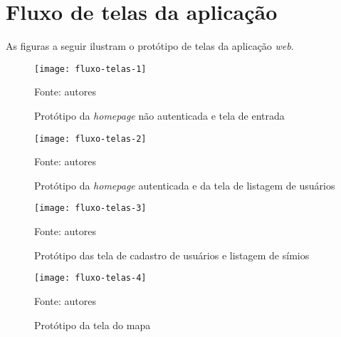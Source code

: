 \chapter{Fluxo de telas da aplicação}

As figuras a seguir ilustram o protótipo de telas da aplicação \emph{web}.

\begin{figure}[ht]
  \centering
    \caption{Protótipo da \emph{homepage} não autenticada e tela de entrada}
    \texttt{[image: fluxo-telas-1]}
  \centerline{\small{Fonte: autores}}
\end{figure}

\begin{figure}[ht]
  \centering
    \caption{Protótipo da \emph{homepage} autenticada e da tela de listagem de usuários} 
    \texttt{[image: fluxo-telas-2]}
  \centerline{\small{Fonte: autores}}
\end{figure}

\begin{figure}[ht]
  \centering
    \caption{Protótipo das tela de cadastro de usuários e listagem de símios}
    \texttt{[image: fluxo-telas-3]}
  \centerline{\small{Fonte: autores}}
\end{figure}

\begin{figure}[ht]
  \centering
    \caption{Protótipo da tela do mapa}
    \texttt{[image: fluxo-telas-4]}
  \centerline{\small{Fonte: autores}}
\end{figure}
